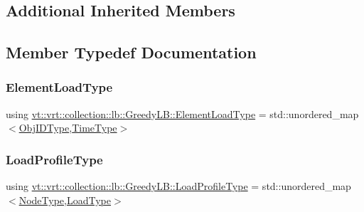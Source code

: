 \subsection*{Additional Inherited Members}


\subsection{Member Typedef Documentation}
\mbox{\label{structvt_1_1vrt_1_1collection_1_1lb_1_1_greedy_l_b_af08e010a34268f2a299ce37dc428ea75}} 
\subsubsection{\texorpdfstring{Element\+Load\+Type}{ElementLoadType}}
{\footnotesize\ttfamily using \hyperlink{structvt_1_1vrt_1_1collection_1_1lb_1_1_greedy_l_b_af08e010a34268f2a299ce37dc428ea75}{vt\+::vrt\+::collection\+::lb\+::\+Greedy\+L\+B\+::\+Element\+Load\+Type} =  std\+::unordered\+\_\+map$<$\hyperlink{structvt_1_1vrt_1_1collection_1_1lb_1_1_base_l_b_a790b22acf448880599724749cdc4e9b3}{Obj\+I\+D\+Type},\hyperlink{namespacevt_a876a9d0cd5a952859c72de8a46881442}{Time\+Type}$>$}

\mbox{\label{structvt_1_1vrt_1_1collection_1_1lb_1_1_greedy_l_b_a3db2c9b36ac99ed4aed38519be4aad60}} 
\subsubsection{\texorpdfstring{Load\+Profile\+Type}{LoadProfileType}}
{\footnotesize\ttfamily using \hyperlink{structvt_1_1vrt_1_1collection_1_1lb_1_1_greedy_l_b_a3db2c9b36ac99ed4aed38519be4aad60}{vt\+::vrt\+::collection\+::lb\+::\+Greedy\+L\+B\+::\+Load\+Profile\+Type} =  std\+::unordered\+\_\+map$<$\hyperlink{namespacevt_a866da9d0efc19c0a1ce79e9e492f47e2}{Node\+Type},\hyperlink{structvt_1_1vrt_1_1collection_1_1lb_1_1_base_l_b_a215e22b9f12678303f49615ae3be05cc}{Load\+Type}$>$}


